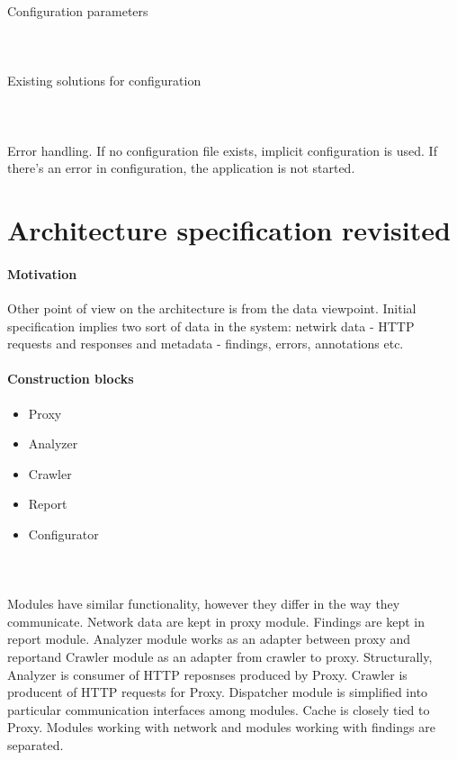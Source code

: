 \documentclass[10pt]{article}
\begin{document}
\paragraph{~}Configuration parameters
\paragraph{~}Existing solutions for configuration
\paragraph{~}Error handling. If no configuration file exists, implicit configuration is used. If there's an error in configuration, the application is not started.
\section{Architecture specification revisited}
\paragraph{Motivation} Other point of view on the architecture is from the data viewpoint. Initial specification implies two sort of data in the system: netwirk data - HTTP requests and responses and metadata - findings, errors, annotations etc.
\paragraph{Construction blocks}
\begin{itemize}
	\item Proxy
	\item Analyzer
	\item Crawler
	\item Report
	\item Configurator
\end{itemize}
\paragraph{~}Modules have similar functionality, however they differ in the way they communicate. Network data are kept in proxy module. Findings are kept in report module. Analyzer module works as an adapter between proxy and reportand Crawler module as an adapter from crawler to proxy. Structurally, Analyzer is consumer of HTTP reposnses produced by Proxy. Crawler is producent of HTTP requests for Proxy. Dispatcher module is simplified into particular communication interfaces among modules. Cache is closely tied to Proxy. Modules working with network and modules working with findings are separated.
\end{document}
